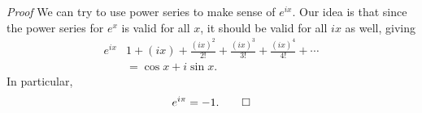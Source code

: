 \documentclass[10pt,]{book}
\makeatletter
\renewcommand*{\proofname}{Proof}
\renewenvironment{proof}[1][\proofname]{\par
  \pushQED{\qed}%
  \normalfont \topsep6\p@\@plus6\p@\relax
  \trivlist
  \item\relax
    {\itshape
    #1\@addpunct{.}}\hspace\labelsep\ignorespaces
}{%
  \popQED\endtrivlist\@endpefalse
}
\numberwithin{equation}{section}
\newcommand{\amp}{&}
\makeatother
\begin{document}
\begin{proof}\hypertarget{proof-14}{}
\hypertarget{p-982}{}%
We can try to use power series to make sense of \(e^{ix}\). Our idea is that since the power series for \(e^{x}\) is valid for all \(x\), it should be valid for all \(ix\) as well, giving%
\begin{align*}
e^{ix} \amp 1 + (ix) + \frac{(ix)^{2}}{2!} + \frac{(ix)^{3}}{3!} + \frac{(ix)^{4}}{4!} + \cdots \\
\amp = \cos x + i\sin x \text{.}
\end{align*}
In particular,%
\begin{equation*}
e^{i\pi} = -1\text{.}\qedhere
\end{equation*}
%
\end{proof}
%
%
\typeout{************************************************}
\typeout{************************************************}
%
\end{document}
